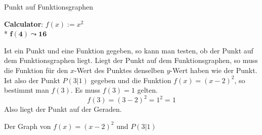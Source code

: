\begin{bla}{Punkt auf Funktionsgraphen}
  \begin{marginfigure}
    \begin{tcolorbox}[colback=white!95!black,colframe=white!75!black,title=CAS:,arc=0mm]
      \begin{scriptsize}
        \textbf{Calculator}: \hfill \( f(x) := x^2 \) \\*
        \hfill \( \bm{f(4) \leadsto 16} \)
      \end{scriptsize}
    \end{tcolorbox}
  \end{marginfigure}
  Ist ein Punkt und eine Funktion gegeben, so kann man testen, ob der Punkt auf dem Funktionsgraphen liegt. Liegt der Punkt auf dem Funktionsgraphen, so muss die Funktion für den $x$-Wert des Punktes denselben $y$-Wert haben wie der Punkt. Ist also der Punkt $P(3|1)$ gegeben und die Funktion $f(x)={(x-2)}^2$, so bestimmt man $f(3)$. Es muss $f(3)=1$ gelten.
  \begin{equation*}
    f(3)={(3-2)}^2=1^2=1
  \end{equation*}
  Also liegt der Punkt auf der Geraden.

  \begin{marginfigure}
    \caption{Der Graph von $f(x)={(x-2)}^2$ und $P(3|1)$}
  \end{marginfigure}
\end{bla}

\newpage

